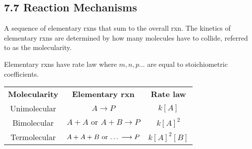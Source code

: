\subsection{7.7 Reaction Mechanisms}
    A sequence of elementary rxns that sum to the overall rxn. The kinetics of elementary rxns are determined by
    how many molecules have to collide, referred to as the molecularity.\\
    \columnbreak

    Elementary rxns have rate law where $m,n,p\dots$ are equal to stoichiometric coefficients.
    \vspace*{0.5em}
    
    \begin{center}
        \begin{tabular}{ |c|c|c| } 
         \hline
         \textbf{Molecularity} & \textbf{Elementary rxn} & \textbf{Rate law} \\
         Unimolecular & $A \longrightarrow P$ & $k[A]$ \\
         Bimolecular & $A + A \textrm{ or } A + B \longrightarrow P$ & $k[A]^2$ \\
         Termolecular & $A + A + B \textrm{ or \dots} \longrightarrow P$ & $k[A]^2[B]$ \\
         \hline
        \end{tabular}
    \end{center}